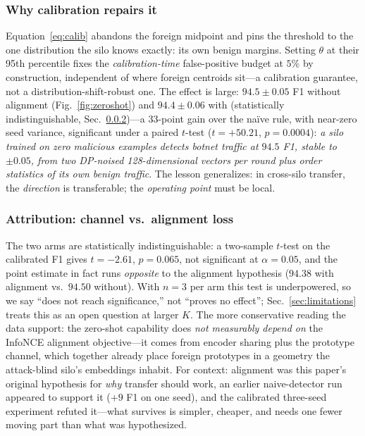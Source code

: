 \documentclass[journal]{IEEEtran}
\begin{document}
\subsubsection{Why calibration repairs it}
Equation~\eqref{eq:calib} abandons the foreign midpoint and pins the
threshold to the one distribution the silo knows exactly: its own
benign margins. Setting $\theta$ at their 95th percentile fixes the
\emph{calibration-time} false-positive budget at $5\%$ by
construction, independent of where foreign centroids sit---a
calibration guarantee, not a distribution-shift-robust one. The effect
is large: $94.5 \pm 0.05$ F1 without alignment (Fig.~\ref{fig:zeroshot})
and $94.4 \pm 0.06$ with (statistically indistinguishable,
Sec.~\ref{sec:zsattribution})---a $33$-point gain over the na\"ive
rule, with near-zero seed variance, significant under a paired
$t$-test ($t{=}+50.21$, $p{=}0.0004$): \emph{a silo trained on zero
malicious examples detects botnet traffic at $94.5$ F1, stable to
$\pm 0.05$, from two DP-noised 128-dimensional vectors per round plus
order statistics of its own benign traffic}. The lesson generalizes:
in cross-silo transfer, the \emph{direction} is transferable; the
\emph{operating point} must be local.

\subsubsection{Attribution: channel vs.\ alignment loss}
\label{sec:zsattribution}
The two arms are statistically indistinguishable: a two-sample
$t$-test on the calibrated F1 gives $t{=}-2.61$, $p{=}0.065$, not
significant at $\alpha{=}0.05$, and the point estimate in fact runs
\emph{opposite} to the alignment hypothesis ($94.38$ with alignment
vs.\ $94.50$ without). With $n{=}3$ per arm this test is underpowered,
so we say ``does not reach significance,'' not ``proves no effect'';
Sec.~\ref{sec:limitations} treats this as an open question at larger
$K$. The more conservative reading the data support: the zero-shot
capability does \emph{not measurably depend on} the InfoNCE alignment
objective---it comes from encoder sharing plus the prototype channel,
which together already place foreign prototypes in a geometry the
attack-blind silo's embeddings inhabit. For context: alignment was
this paper's original hypothesis for \emph{why} transfer should work,
an earlier naive-detector run appeared to support it ($+9$ F1 on
one seed), and the calibrated three-seed experiment refuted it---what
survives is simpler, cheaper, and needs one fewer moving part than
what was hypothesized.
\end{document}
